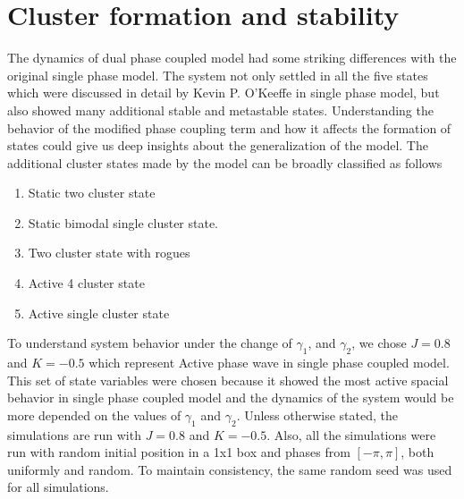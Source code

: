 \documentclass[twocolumn,10pt]{asme2ej}
\begin{document}



\section{Cluster formation and stability}
{
    The dynamics of dual phase coupled model had some striking differences with the original single phase model. The system not only settled in all the five states which were discussed in detail by Kevin P. O'Keeffe in single phase model, but also showed many additional stable and metastable states. Understanding the behavior of the modified phase coupling term and how it affects the formation of states could give us deep insights about the generalization of the model.
    The additional cluster states made by the model can be broadly classified as follows 
    \begin{enumerate}[label = (\alph*)]
        \item Static two cluster state
        \item Static bimodal single cluster state.
        \item Two cluster state with rogues 
        \item Active 4 cluster state
        \item Active single cluster state
    \end{enumerate}
    \noindent
    To understand system behavior under the change of \(\gamma_1\), and \(\gamma_2\), we chose \(J = 0.8\) and \(K = -0.5\) which represent Active phase wave in single phase coupled model. This set of state variables were chosen because it showed the most active spacial behavior in single phase coupled model and the dynamics of the system would be more depended on the values of \(\gamma_1\) and \(\gamma_2\). Unless otherwise stated, the simulations are run with \(J = 0.8\) and \(K = -0.5\). Also, all the simulations were run with random initial position in a 1x1 box and phases from \([-\pi, \pi]\), both uniformly and random. To maintain consistency, the same random seed was used for all simulations.
    \begin{figure}[h!]

\end{figure}}
\end{document}

